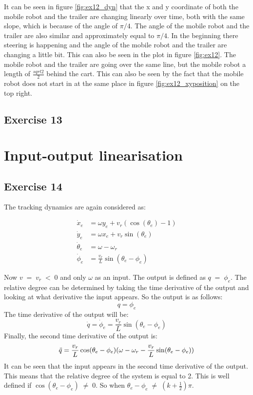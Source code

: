 It can be seen in figure \ref{fig:ex12_dyn} that the x and y coordinate of both the mobile robot and the trailer are changing linearly over time, both with the same slope, which is because of the angle of $\pi/4$. The angle of the mobile robot and the trailer are also similar and approximately equal to $\pi/4$. In the beginning there steering is happening and the angle of the mobile robot and the trailer are changing a little bit. This can also be seen in the plot in figure \ref{fig:ex12}. The mobile robot and the trailer are going over the same line, but the mobile robot a length of $\frac{sqrt{2}}{2}$ behind the cart. This can also be seen by the fact that the mobile robot does not start in at the same place in figure \ref{fig:ex12_xyposition} on the top right. 
\subsection{Exercise 13}


\section{Input-output linearisation}

\subsection{Exercise 14}

The tracking dynamics are again considered as:

\begin{align}
    \dot{x}_e &= \omega y_e + v_r (\cos(\theta_e) -1) \label{eq:ex14_dotx}\\
    \dot{y}_e &= \omega x_e + v_r \sin(\theta_e) \label{eq:ex14_doty}\\
    \dot{\theta}_e &= \omega - \omega_r \label{eq:ex14_dottheta}\\
    \dot{\phi}_e &= \frac{v_r}{L}\sin(\theta_e - \phi_e) \label{eq:ex14_dotphi}
\end{align}

Now $v\;=\;v_r\;<\;0$ and only $\omega$ as an input. The output is defined as $q\;=\;\phi_e$. The relative degree can be determined by taking the time derivative of the output and looking at what derivative the input appears. So the output is as follows:
\begin{equation}
    q = \phi_e
    \label{eq:ex14_q}
\end{equation}
The time derivative of the output will be:
\begin{equation}
    \dot{q} = \dot{\phi}_e = \frac{v_r}{L}\sin(\theta_e - \phi_e)
    \label{eq:ex14_qdot}
\end{equation}
Finally, the second time derivative of the output is:
\begin{equation}
    \Ddot{q} = \frac{v_r}{L} \cos(\theta_e - \phi_e) ( \omega - \omega_r - \frac{v_r}{L} \sin(\theta_e - \phi_e))
    \label{eq:ex14_qddot}
\end{equation}
It can be seen that the input appears in the second time derivative of the output. This means that the relative degree of the system is equal to 2. This is well defined if $\cos(\theta_e - \phi_e)\;\neq\;0$. So when $\theta_e - \phi_e\;\neq\;(k + \frac{1}{2}) \pi$.



